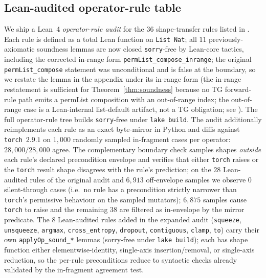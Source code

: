 \subsection{Lean-audited operator-rule table}
\label{sec:eval-lean}

We ship a Lean~4 \emph{operator-rule audit} for the $36$
shape-transfer rules listed in .
Each rule is defined as a total Lean function on
\texttt{List Nat}; all $11$ previously-axiomatic
soundness lemmas are now closed \texttt{sorry}-free by Lean-core
tactics, including the corrected in-range form
\texttt{permList\_compose\_inrange}; the original
\texttt{permList\_compose} statement was unconditional and is
false at the boundary, so we restate the lemma in the appendix
under its in-range form (the in-range restatement is sufficient
for Theorem~\ref{thm:soundness} because no \textsc{TG}
forward-rule path emits a permList composition with an
out-of-range index; the out-of-range case is a Lean-internal
list-default artifact, not a \textsc{TG} obligation; see
). The full operator-rule
tree builds \texttt{sorry}-free under \texttt{lake build}.
The audit additionally reimplements each rule as an exact
byte-mirror in Python and diffs against \texttt{torch}~$2.9.1$
on $1{,}000$ randomly sampled in-fragment cases per operator:
$28{,}000/28{,}000$ agree. The complementary boundary check
samples shapes \emph{outside} each rule's declared precondition
envelope and verifies that either \texttt{torch} raises or the
\texttt{torch} result shape disagrees with the rule's
prediction; on the $28$ Lean-audited rules of the original
audit and $6{,}913$
off-envelope samples we observe $0$ silent-through cases (i.e.\
no rule has a precondition strictly narrower than
\texttt{torch}'s permissive behaviour on the sampled mutators);
$6{,}875$ samples cause \texttt{torch} to raise and the
remaining $38$ are filtered as in-envelope by the mirror
predicate. The $8$ Lean-audited rules added in the expanded
audit (\texttt{squeeze}, \texttt{unsqueeze}, \texttt{argmax},
\texttt{cross\_entropy}, \texttt{dropout}, \texttt{contiguous},
\texttt{clamp}, \texttt{to}) carry their own \texttt{applyOp\_sound\_*}
lemmas (sorry-free under \texttt{lake build}); each has shape function
either elementwise-identity, single-axis insertion/removal, or
single-axis reduction, so the per-rule preconditions reduce to
syntactic checks already validated by the in-fragment
agreement test.

